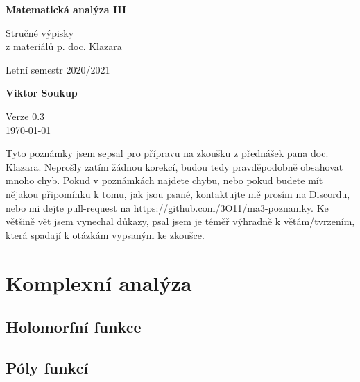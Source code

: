 \documentclass[11pt]{article}
\theoremstyle{nontheoremstyle}
\theoremstyle{nontheoremstylenodot}
\theoremstyle{theoremstyle}
\begin{document}
\begin{titlepage}
    \begin{center}
        \vspace*{1cm}
            
        \Huge
        \textbf{Matematická analýza III}
            
        \vspace{0.5cm}
        \LARGE
        Stručné výpisky
        \\

        z materiálů p. doc. Klazara

        \vspace{5mm}
        
        Letní semestr 2020/2021
        
        \vspace{1.5cm}
            
        \textbf{Viktor Soukup}
        
        \vfill
        \flushright
        \normalsize
        Verze 0.3\\
        \today
        
    \end{center}
\end{titlepage}

Tyto poznámky jsem sepsal pro přípravu na zkoušku z přednášek pana doc. Klazara.
Neprošly zatím žádnou korekcí, budou tedy pravděpodobně obsahovat mnoho chyb.
Pokud v poznámkách najdete chybu, nebo pokud budete mít nějakou připomínku k tomu,
jak jsou psané, kontaktujte mě prosím na Discordu, nebo mi dejte pull-request na
\url{https://github.com/3O11/ma3-poznamky}. Ke většině vět jsem vynechal důkazy,
psal jsem je téměř výhradně k větám/tvrzením, která spadají k otázkám vypsaným ke zkoušce.
\clearpage

\tableofcontents
\clearpage




\section{Komplexní analýza}
\subsection{Holomorfní funkce}
\subsection{Póly funkcí}
\end{document}
